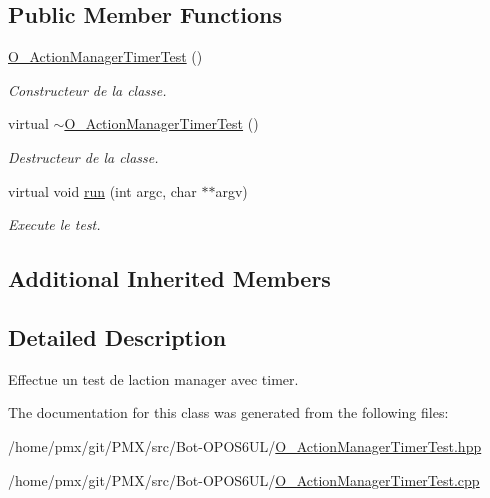 \subsection*{Public Member Functions}
\begin{DoxyCompactItemize}
\item 
\mbox{\label{classO__ActionManagerTimerTest_a6076f26cb42926f290bee5f96a39071e}} 
\hyperlink{classO__ActionManagerTimerTest_a6076f26cb42926f290bee5f96a39071e}{O\+\_\+\+Action\+Manager\+Timer\+Test} ()
\begin{DoxyCompactList}\small\item\em Constructeur de la classe. \end{DoxyCompactList}\item 
\mbox{\label{classO__ActionManagerTimerTest_a7c7433fa2ecefb53bfaecaf99d16c509}} 
virtual \hyperlink{classO__ActionManagerTimerTest_a7c7433fa2ecefb53bfaecaf99d16c509}{$\sim$\+O\+\_\+\+Action\+Manager\+Timer\+Test} ()
\begin{DoxyCompactList}\small\item\em Destructeur de la classe. \end{DoxyCompactList}\item 
\mbox{\label{classO__ActionManagerTimerTest_ab88b301cdfa06385c521335dd27932c9}} 
virtual void \hyperlink{classO__ActionManagerTimerTest_ab88b301cdfa06385c521335dd27932c9}{run} (int argc, char $\ast$$\ast$argv)
\begin{DoxyCompactList}\small\item\em Execute le test. \end{DoxyCompactList}\end{DoxyCompactItemize}
\subsection*{Additional Inherited Members}


\subsection{Detailed Description}
Effectue un test de l\textquotesingle{}action manager avec timer. 

The documentation for this class was generated from the following files\+:\begin{DoxyCompactItemize}
\item 
/home/pmx/git/\+P\+M\+X/src/\+Bot-\/\+O\+P\+O\+S6\+U\+L/\hyperlink{O__ActionManagerTimerTest_8hpp}{O\+\_\+\+Action\+Manager\+Timer\+Test.\+hpp}\item 
/home/pmx/git/\+P\+M\+X/src/\+Bot-\/\+O\+P\+O\+S6\+U\+L/\hyperlink{O__ActionManagerTimerTest_8cpp}{O\+\_\+\+Action\+Manager\+Timer\+Test.\+cpp}\end{DoxyCompactItemize}

